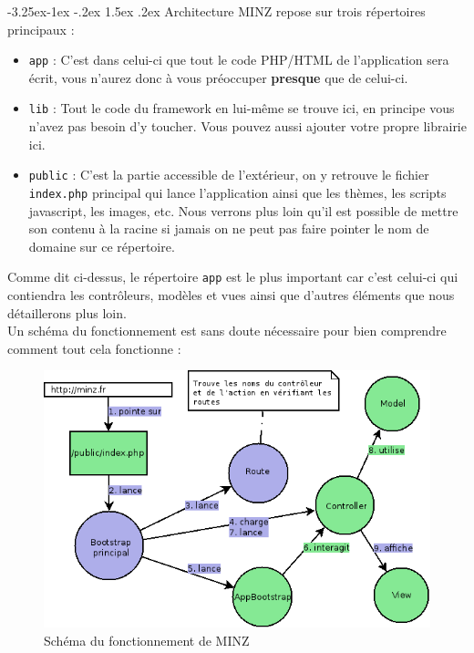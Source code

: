 \documentclass[a4paper,11pt]{article}
\makeatletter
\renewcommand{\subsection}{\@startsection{subsection}{2}{\z@}%
             {-3.25ex\@plus -1ex \@minus -.2ex}%
             {1.5ex \@plus .2ex}%
             {\color{bleuFonce}\normalfont\large\bfseries}}
\makeatother
\begin{document}
\subsection{Architecture}
MINZ repose sur trois répertoires principaux :
\begin{itemize}
  \item \texttt{app} : C'est dans celui-ci que tout le code PHP/HTML de l'application sera écrit, vous n'aurez donc à vous préoccuper \textbf{presque} que de celui-ci.
  \item \texttt{lib} : Tout le code du framework en lui-même se trouve ici, en principe vous n'avez pas besoin d'y toucher. Vous pouvez aussi ajouter votre propre librairie ici.
  \item \texttt{public} : C'est la partie accessible de l'extérieur, on y retrouve le fichier \texttt{index.php} principal qui lance l'application ainsi que les thèmes, les scripts javascript, les images, etc. Nous verrons plus loin qu'il est possible de mettre son contenu à la racine si jamais on ne peut pas faire pointer le nom de domaine sur ce répertoire.
\end{itemize}

Comme dit ci-dessus, le répertoire \texttt{app} est le plus important car c'est celui-ci qui contiendra les contrôleurs, modèles et vues ainsi que d'autres éléments que nous détaillerons plus loin.\\

Un schéma du fonctionnement est sans doute nécessaire pour bien comprendre comment tout cela fonctionne :
\begin{figure}[h]
  \centering
  \includegraphics[width=13cm]{schemaFonctionnement.png}
  \caption{Schéma du fonctionnement de MINZ}
  \label{fig1}
\end{figure}
\end{document}
